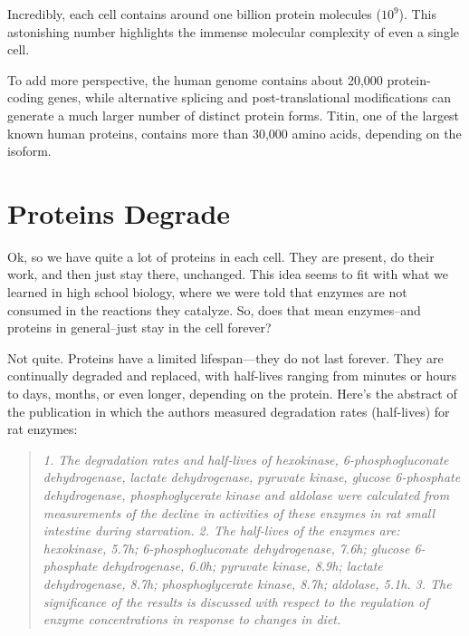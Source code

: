 Incredibly, each cell contains around one billion protein molecules ($10^9$). This astonishing number highlights the immense molecular complexity of even a single cell.

To add more perspective, the human genome contains about 20,000 protein-coding genes, while alternative splicing and post-translational modifications can generate a much larger number of distinct protein forms. Titin, one of the largest known human proteins, contains more than 30,000 amino acids, depending on the isoform.

\section{Proteins Degrade}

Ok, so we have quite a lot of proteins in each cell. They are present, do their work, and then just stay there, unchanged. This idea seems to fit with what we learned in high school biology, where we were told that enzymes are not consumed in the reactions they catalyze. So, does that mean enzymes--and proteins in general--just stay in the cell forever?

Not quite. Proteins have a limited lifespan—they do not last forever. They are continually degraded and replaced, with half-lives ranging from minutes or hours to days, months, or even longer, depending on the protein. Here's the abstract of the publication in which the authors measured degradation rates (half-lives) for rat enzymes:

\begin{quote}
    \textit{1. The degradation rates and half-lives of hexokinase, 6-phosphogluconate dehydrogenase, lactate dehydrogenase, pyruvate kinase, glucose 6-phosphate dehydrogenase, phosphoglycerate kinase and aldolase were calculated from measurements of the decline in activities of these enzymes in rat small intestine during starvation. 2. The half-lives of the enzymes are: hexokinase, 5.7h; 6-phosphogluconate dehydrogenase, 7.6h; glucose 6-phosphate dehydrogenase, 6.0h; pyruvate kinase, 8.9h; lactate dehydrogenase, 8.7h; phosphoglycerate kinase, 8.7h; aldolase, 5.1h. 3. The significance of the results is discussed with respect to the regulation of enzyme concentrations in response to changes in diet.}
\end{quote}


